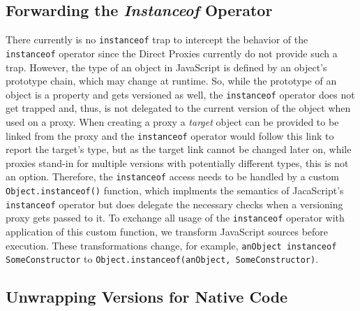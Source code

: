 \subsection{Forwarding the \emph{Instanceof} Operator}

There currently is no \lstinline{instanceof} trap to intercept the behavior of the \lstinline{instanceof} operator since the Direct Proxies currently do not provide such a trap.
However, the type of an object in JavaScript is defined by an object's prototype chain, which may change at runtime.
So, while the prototype of an object is a property and gets versioned as well, the \lstinline{instanceof} operator does not get trapped and, thus, is not delegated to the current version of the object when used on a proxy.
When creating a proxy a \emph{target} object can be provided to be linked from the proxy and the \lstinline{instanceof} operator would follow this link to report the target's type, but as the target link cannot be changed later on, while proxies stand-in for multiple versions with potentially different types, this is not an option.
Therefore, the \lstinline{instanceof} access needs to be handled by a custom \lstinline{Object.instanceof()} function, which implments the semantics of JacaScript's \lstinline{instanceof} operator but does delegate the necessary checks when a versioning proxy gets passed to it.
To exchange all usage of the \lstinline{instanceof} operator with application of this custom function, we transform JavaScript sources before execution.
These transformations change, for example, \lstinline{anObject instanceof SomeConstructor} to \lstinline{Object.instanceof(anObject, SomeConstructor)}.


\subsection{Unwrapping Versions for Native Code}

